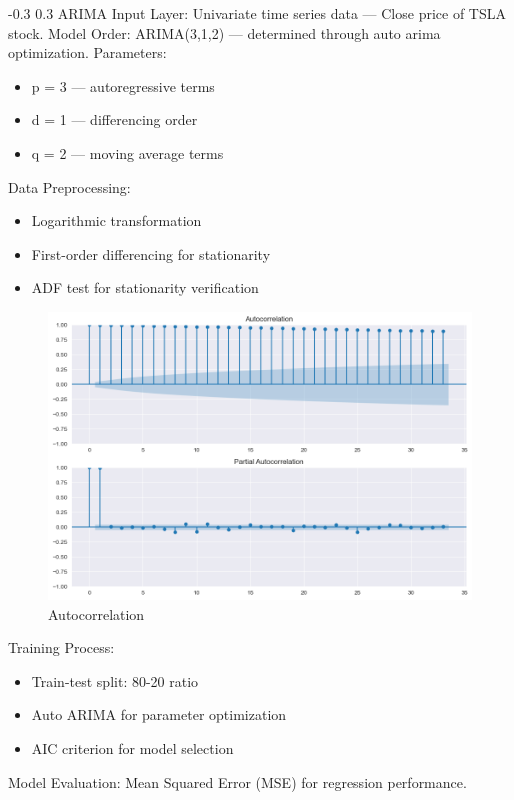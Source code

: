 \documentclass[twocolumn]{llncs}
\makeatletter
\renewcommand{\subsection}{\@startsection{subsection}{2}{\z@}%
  {-0.3\baselineskip}  %
  {0.3\baselineskip}   %
  {\normalfont\normalsize\bfseries}}
\makeatother
\begin{document}
\subsection{ARIMA}
Input Layer: Univariate time series data — Close price of TSLA stock.
\noindent Model Order: ARIMA(3,1,2) — determined through auto arima optimization.
\noindent Parameters:
\begin{itemize}
\item p = 3 — autoregressive terms
\item d = 1 — differencing order
\item q = 2 — moving average terms
\end{itemize}
\noindent Data Preprocessing:
\begin{itemize}
\item Logarithmic transformation
\item First-order differencing for stationarity
\item ADF test for stationarity verification
\end{itemize}

\begin{figure}[H]
    \centering
    \includegraphics[width=1\linewidth]{Autocorrelation.png}
    \caption{Autocorrelation}
    \label{fig:boxplot}
\end{figure}

\noindent Training Process:
\begin{itemize}
\item Train-test split: 80-20 ratio
\item Auto ARIMA for parameter optimization
\item AIC criterion for model selection
\end{itemize}
\noindent Model Evaluation: Mean Squared Error (MSE) for regression performance.
\end{document}
